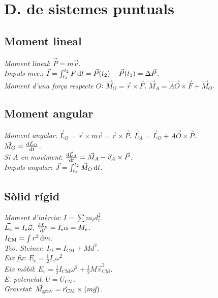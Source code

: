 \section{D. de sistemes puntuals}

\subsection{Moment lineal}
\emph{Moment lineal}: $\vec{P} = m\vec{v}$. \\
\emph{Impuls mec.}: $\vec{I} = \int_{t_1}^{t_2} F \dif t = \vec{P}(t_2) - \vec{P}(t_1) = \Delta\vec{P}$. \\
\emph{Moment d'una força respecte $O$}: $\vec{M}_O = \vec{r}\times\vec{F}$, $\vec{M}_A = \vec{AO}\times\vec{F} + \vec{M}_O$.

\subsection{Moment angular}
\emph{Moment angular}: $\vec{L}_O = \vec{r}\times m\vec{v} = \vec{r}\times\vec{P}$, $\vec{L}_A = \vec{L}_O + \vec{AO}\times\vec{P}$. \\
\ci $\vec{M}_O = \frac{\dif \vec{L}_O}{\dif t}$. \\
\emph{Si $A$ en moviment}: $\frac{\dif \vec{L}_A}{\dif t} = \vec{M}_A - \vec{v}_A\times\vec{P}$.\\
\emph{Impuls angular}: $\vec{J} = \int_{t_1}^{t_2} \vec{M}_O\dif t$.

\subsection{Sòlid rígid}
\emph{Moment d'inèrcia}: $I = \sum m_i d_i^2$. \\
\ci $\vec{L_e} = I_e\vec{\omega},\, \frac{\dif L_e}{\dif t} = I_e\alpha = M_e$. \\
\ci $I_{\text{CM}} = \int r^2 \dif m$. \\
\emph{Teo. Steiner}: $I_O = I_{\text{CM}} + Md^2$. \\
\emph{Eix fix}: $E_\text{c} = \frac{1}{2} I_e \omega^2 $\\
\emph{Eix mòbil}: $E_{\text{c}} = \frac{1}{2} I_\text{CM}\omega^2 + \frac{1}{2}  M\vec{v}_{\text{CM}}^2$.\\
\emph{E. potencial}: $U = U_{\text{CM}}$.\\
\emph{Gravetat}: $\vec{M}_\text{grav} = \vec{r}_\text{CM} \times \left( m \vec{g} \right)$.

